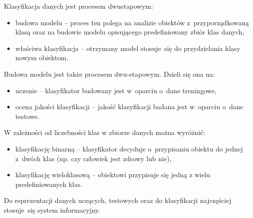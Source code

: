 Klasyfikacja danych jest procesem dwuetapowym:
\begin{itemize}
	\item budowa modelu – proces ten polega na analizie obiektów z przyporządkowaną klasą oraz na budowie modelu opisującego predefiniowany zbiór klas danych,
	\item właściwa klasyfikacja – otrzymany model stosuje się do przydzielania klasy nowym obiektom.
\end{itemize}
Budowa modelu jest także procesem dwu-etapowym. Dzieli się ona na:
\begin{itemize}
	\item uczenie – klasyfikator budowany jest w oparciu o dane treningowe,
	\item ocena jakości klasyfikacji – jakość klasyfikacji badana jest w oparciu o dane testowe.
\end{itemize}
W zależności od liczebności klas w zbiorze danych można wyróżnić:
\begin{itemize}
	\item klasyfikację binarną – klasyfikator decyduje o przypisaniu obiektu do jednej z dwóch klas (np. czy człowiek jest zdrowy lub nie),
	\item klasyfikację wieloklasową – obiektowi przypisuje się jedną z wielu predefiniowanych klas.
\end{itemize}
Do reprezentacji danych uczących, testowych oraz do klasyfikacji najczęściej stosuje się system informacyjny.
\begin{table}[H]
\begin{center}
	\caption[Przykła danych treningowych]{Przykład danych treningowych składających się z 5 atrybutów oraz klasy decyzyjnej. W ostatniej kolumnie znajduje się wynik klasyfikacji. W pięciu przypadkach, klasyfikator poprawnie wskazał klasę.}
	\label{system_informacyjny}
\end{center}
\end{table}

